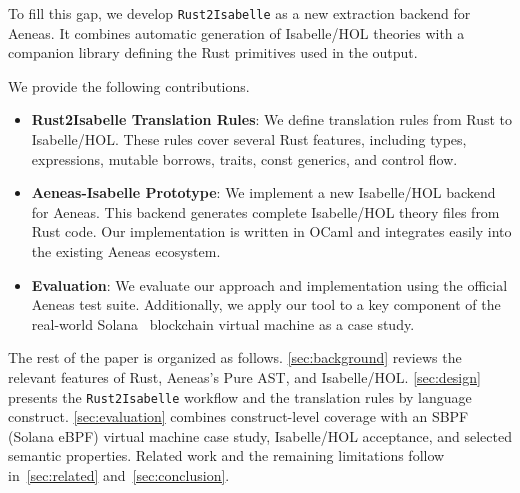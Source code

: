 To fill this gap, we develop \texttt{Rust2Isabelle} as a new extraction backend for Aeneas.
It combines automatic generation of Isabelle/HOL theories with a companion library defining the Rust primitives used in the output.

We provide the following contributions.
\begin{itemize}
    \item \textbf{Rust2Isabelle Translation Rules}: We define translation rules from Rust to Isabelle/HOL. 
    These rules cover several Rust features, including types, expressions, mutable borrows, traits, const generics, and control flow.
    \item \textbf{Aeneas-Isabelle Prototype}: We implement a new Isabelle/HOL backend for Aeneas. 
    This backend generates complete Isabelle/HOL theory files from Rust code. 
    Our implementation is written in OCaml and integrates easily into the existing Aeneas ecosystem.
    \item \textbf{Evaluation}: We evaluate our approach and implementation using the official Aeneas test suite. 
    Additionally, we apply our tool to a key component of the real-world Solana~\cite{SolanaRBPF2} blockchain virtual machine as a case study.
\end{itemize}


{
\def\sectionautorefname{Section}
The rest of the paper is organized as follows.
\autoref{sec:background} reviews the relevant features of Rust, Aeneas's Pure AST, and Isabelle/HOL. 
\autoref{sec:design} presents the \texttt{Rust2Isabelle} workflow and the translation rules by language construct.
\autoref{sec:evaluation} combines construct-level coverage with an SBPF (Solana eBPF) virtual machine case study, Isabelle/HOL acceptance, and selected semantic properties.
Related work and the remaining limitations follow in~\autoref{sec:related} and~\autoref{sec:conclusion}.
}